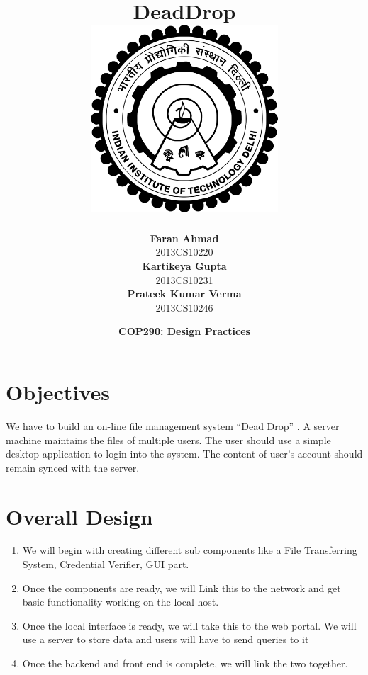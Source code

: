 \documentclass{article}
\title{\vspace*{\fill} \textbf{DeadDrop} \\
	\vspace{5mm} \includegraphics[width=7cm]{logo.png}}
\author{
	\textbf{Faran Ahmad}\\
	2013CS10220 \vspace{2mm} \\
	\textbf{Kartikeya Gupta}\\ 
	2013CS10231 \vspace{2mm} \\
	\textbf{Prateek Kumar Verma}\\ 
	2013CS10246
}
\date{\textbf{COP290: Design Practices} \vspace*{\fill}}
\begin{document}
	\maketitle

	\newpage

	\tableofcontents

	\pagebreak

	\section{Objectives}
	We have to build an on-line file management system ``Dead Drop'' . A server machine maintains the files of multiple users. The user should use a simple desktop application to login into the system. The content of user's account should remain synced with the server. 

	\section{Overall Design}
		\begin{enumerate}
			\item We will begin with creating different sub components like a File Transferring System, Credential Verifier, GUI part.
			\item Once the components are ready, we will Link this to the network and get basic functionality working on the local-host.
			\item Once the local interface is ready, we will take this to the web portal. We will use a server to store data and users will have to send queries to it
			\item Once the backend and front end is complete, we will link the two together.
		\end{enumerate}
\end{document}
